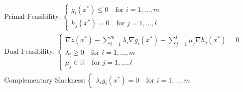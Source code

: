 \begin{theorem}
\begin{gather*}
\text{Primal Feasibility}: \left\{
\begin{aligned}
g_i({x}^*) \leq 0 \quad \text{for $i = 1,\dots,m$}\\
h_j({x}^*) = 0 \quad \text{for $j = 1,\dots,l$}
\end{aligned}
\right.\\
\text{Dual Feasibility}:\left\{
\begin{aligned}
\nabla z({x}^*) - \sum_{i = 1}^m\lambda_i\nabla g_i({x}^*) - \sum_{j = 1}^{l}\mu_j\nabla h_j({x}^*) = {0}\\
\lambda_i \geq 0 \quad \text{for $i=1,\dots,m$}\\
\mu_j \in \mathbb{R} \quad \text{for $j = 1,\dots,l$}
\end{aligned}
\right.\\
\text{Complementary Slackness}:\left\{
\begin{aligned}
\lambda_ig_i({x}^*) = 0 \quad \text{for $i = 1,\dots,m$}
\end{aligned}
\right.
\end{gather*}
\label{thm:KKT7}
\end{theorem}

